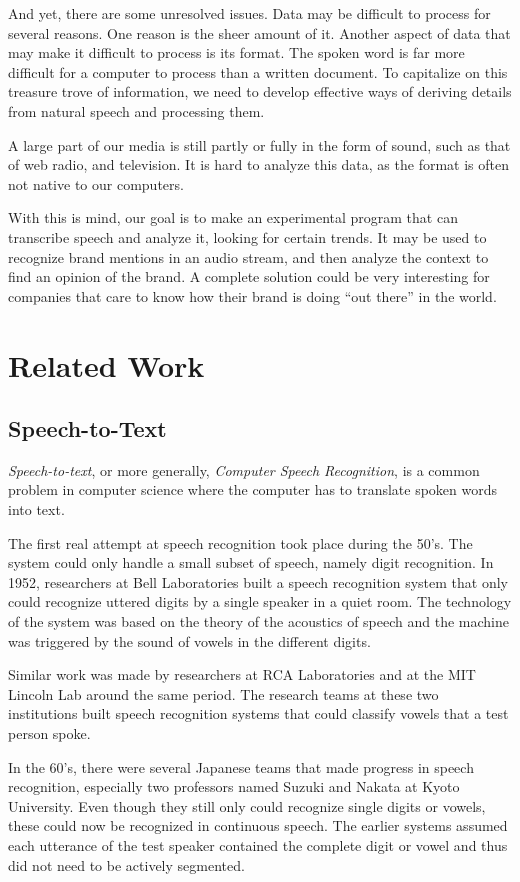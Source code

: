 \documentclass[a4paper,12pt,twoside]{ltxdoc}
\begin{document}
And yet, there are some unresolved issues. Data may be difficult to process for several reasons. One reason is the sheer
amount of it. Another aspect of data that may make it difficult to process is its format. The spoken word is
far more difficult for a computer to process than a written document. To capitalize on this treasure trove of information, we need
to develop effective ways of deriving details from natural speech and processing them.

A large part of our media is still partly or fully in the form of sound, such as that of web radio, and television.
It is hard to analyze this data, as the format is often not native to our computers. 

With this is mind, our goal is to make an experimental program that can transcribe speech and analyze it, looking for certain trends.
It may be used to recognize brand mentions in an audio stream, and then analyze the context to find an opinion of the brand.
A complete solution could be very interesting for companies that care to know how their brand is doing ``out there'' in the world.

\section{Related Work}
\subsection{Speech-to-Text}
\emph{Speech-to-text}, or more generally, \emph{Computer Speech Recognition}, is a common problem in computer science where the computer has to translate spoken words into text.

The first real attempt at speech recognition took place during the 50's. The system could only handle a small subset of speech, namely digit recognition. In 1952, researchers at Bell Laboratories built a speech recognition system that only could recognize uttered digits by a single speaker in a quiet room. The technology of  the system was based on the theory of the acoustics of speech and the machine was triggered by the sound of vowels in the different digits.

Similar work was made by researchers at RCA Laboratories and at the MIT Lincoln Lab around the same period. The research teams at these two institutions built speech recognition systems that could classify vowels that a test person spoke.

In the 60's, there were several Japanese teams that made progress in speech recognition, especially two professors named Suzuki and Nakata at Kyoto University. Even though they still only could recognize single digits or vowels, these could now be recognized in continuous speech. The earlier systems assumed each utterance of the test speaker contained the complete digit or vowel and thus did not need to be actively segmented.  
\end{document}
